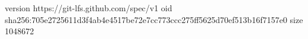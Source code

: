 version https://git-lfs.github.com/spec/v1
oid sha256:705e2725611d3f4ab4e4517be72e7cc773ccc275ff5625d70ef513b16f7157e0
size 1048672
